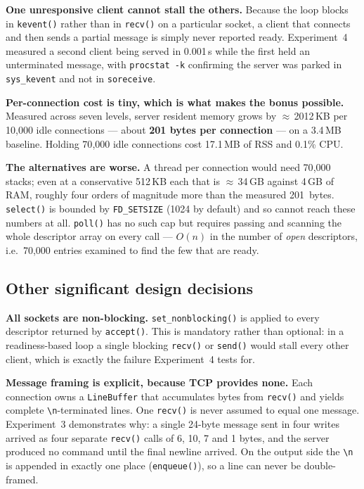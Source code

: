 \documentclass[11pt,a4paper]{article}
\newcommand{\cmd}[1]{\texttt{\small #1}}
\begin{document}
\textbf{One unresponsive client cannot stall the others.} Because the loop
blocks in \cmd{kevent()} rather than in \cmd{recv()} on a particular socket, a
client that connects and then sends a partial message is simply never reported
ready. Experiment~4 measured a second client being served in
0.001\,s while the first held an unterminated message, with
\cmd{procstat -k} confirming the server was parked in \cmd{sys\_kevent} and not
in \cmd{soreceive}.

\textbf{Per-connection cost is tiny, which is what makes the bonus possible.}
Measured across seven levels, server resident memory grows by
$\approx$\,2012\,KB per 10{,}000 idle connections --- about
\textbf{201 bytes per connection} --- on a 3.4\,MB baseline. Holding
70{,}000 idle connections cost 17.1\,MB of RSS and 0.1\% CPU.

\textbf{The alternatives are worse.} A thread per connection would need 70{,}000
stacks; even at a conservative 512\,KB each that is
$\approx$\,34\,GB against 4\,GB of RAM, roughly four
orders of magnitude more than the measured 201~bytes. \cmd{select()} is bounded
by \cmd{FD\_SETSIZE} (1024 by default) and so cannot reach these numbers at all.
\cmd{poll()} has no such cap but requires passing and scanning the whole
descriptor array on every call --- $O(n)$ in the number of \emph{open}
descriptors, i.e.\ 70{,}000 entries examined to find the few that are ready.

\subsection{Other significant design decisions}

\textbf{All sockets are non-blocking.} \cmd{set\_nonblocking()} is applied to
every descriptor returned by \cmd{accept()}. This is mandatory rather than
optional: in a readiness-based loop a single blocking \cmd{recv()} or
\cmd{send()} would stall every other client, which is exactly the failure
Experiment~4 tests for.

\textbf{Message framing is explicit, because TCP provides none.} Each connection
owns a \cmd{LineBuffer} that accumulates bytes from \cmd{recv()} and yields
complete \verb|\n|-terminated lines. One \cmd{recv()} is never assumed to equal
one message. Experiment~3 demonstrates why: a single 24-byte message sent in
four writes arrived as four separate \cmd{recv()} calls of 6, 10, 7 and 1 bytes,
and the server produced no command until the final newline arrived. On the
output side the \verb|\n| is appended in exactly one place (\cmd{enqueue()}), so
a line can never be double-framed.
\end{document}
